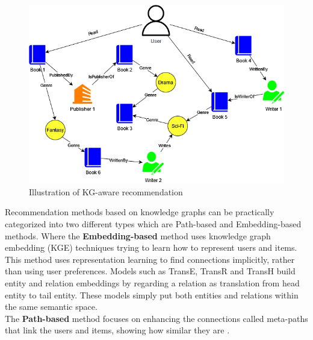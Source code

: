 \documentclass[\myFontSize,a4paper,oneside,english,hidelinks]{article}
\begin{document}
\begin{figure}[h!]
    \centering
    \includegraphics[width=1\textwidth]{img/knowledge_graph_example.png}
    \caption{Illustration of KG-aware recommendation}
    \label{fig:knowledge_graph_example}
\end{figure}
%
%
\newpage{}
Recommendation methods based on knowledge graphs can be practically categorized into two different types which are Path-based and Embedding-based methods. Where the \textbf{Embedding-based} method uses knowledge graph embedding (KGE) techniques trying to learn how to represent users and items. This method uses representation learning to find connections implicitly, rather than using user preferences. Models such as TransE, TransR and TransH build entity and relation embeddings by regarding a relation as translation from head entity to tail entity. These models simply put both entities and relations within the same semantic space. \cite{pub.1148917041}\\
The \textbf{Path-based} method focuses on enhancing the connections called meta-paths that link the users and items, showing how similar they are \cite{Yang20229308}. \\
%
\end{document}
